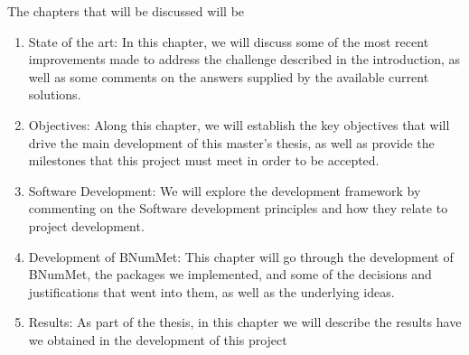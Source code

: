 The chapters that will be discussed will be
\begin{enumerate}
    \item State of the art:
    In this chapter, we will discuss some of the most recent improvements made to address the challenge described in the introduction, as well as some comments on the answers supplied by the available current solutions.

        
    \item Objectives: 
    Along this chapter, we will establish the key objectives that will drive the main development of this master's thesis, as well as provide the milestones that this project must meet in order to be accepted.

    
    
    \item Software Development:
    We will explore the development framework by commenting on the Software development principles and how they relate to project development.


    \item Development of BNumMet:
    This chapter will go through the development of BNumMet, the packages we implemented, and some of the decisions and justifications that went into them, as well as the underlying ideas.


        
    \item Results:
    As part of the thesis, in this chapter we will describe the results have we obtained in the development of this project
    

\end{enumerate}